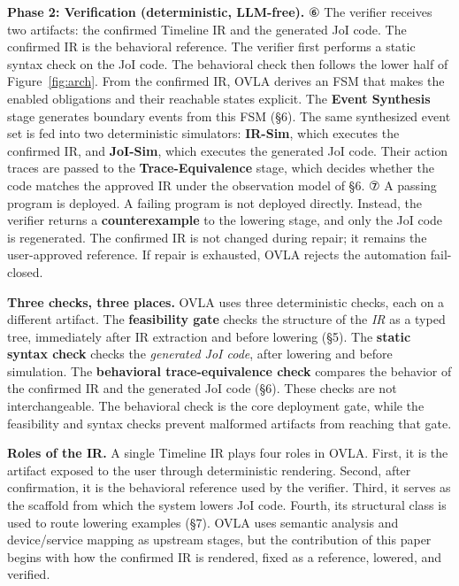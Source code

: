\documentclass[sigconf,nonacm,anonymous,review]{acmart}
\begin{document}
\textbf{Phase 2: Verification (deterministic, LLM-free).} ⑥ The verifier receives two artifacts: the confirmed Timeline IR and the generated JoI code. The confirmed IR is the behavioral reference. The verifier first performs a static syntax check on the JoI code. The behavioral check then follows the lower half of Figure~\ref{fig:arch}. From the confirmed IR, OVLA derives an FSM that makes the enabled obligations and their reachable states explicit. The \textbf{Event Synthesis} stage generates boundary events from this FSM (\S6). The same synthesized event set is fed into two deterministic simulators: \textbf{IR-Sim}, which executes the confirmed IR, and \textbf{JoI-Sim}, which executes the generated JoI code. Their action traces are passed to the \textbf{Trace-Equivalence} stage, which decides whether the code matches the approved IR under the observation model of \S6. ⑦ A passing program is deployed. A failing program is not deployed directly. Instead, the verifier returns a \textbf{counterexample} to the lowering stage, and only the JoI code is regenerated. The confirmed IR is not changed during repair; it remains the user-approved reference. If repair is exhausted, OVLA rejects the automation fail-closed.

\textbf{Three checks, three places.} OVLA uses three deterministic checks, each on a different artifact. The \textbf{feasibility gate} checks the structure of the \emph{IR} as a typed tree, immediately after IR extraction and before lowering (\S5). The \textbf{static syntax check} checks the \emph{generated JoI code}, after lowering and before simulation. The \textbf{behavioral trace-equivalence check} compares the behavior of the confirmed IR and the generated JoI code (\S6). These checks are not interchangeable. The behavioral check is the core deployment gate, while the feasibility and syntax checks prevent malformed artifacts from reaching that gate.

\textbf{Roles of the IR.} A single Timeline IR plays four roles in OVLA. First, it is the artifact exposed to the user through deterministic rendering. Second, after confirmation, it is the behavioral reference used by the verifier. Third, it serves as the scaffold from which the system lowers JoI code. Fourth, its structural class is used to route lowering examples (\S7). OVLA uses semantic analysis and device/service mapping as upstream stages, but the contribution of this paper begins with how the confirmed IR is rendered, fixed as a reference, lowered, and verified.
\end{document}
